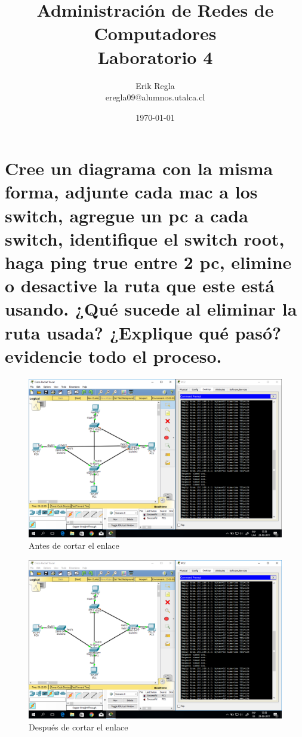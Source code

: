 \documentclass[11pt]{utalcaDoc}
\title{{\bf Administración de Redes de Computadores}\\ Laboratorio 4}
\author{Erik Regla\\ eregla09@alumnos.utalca.cl}
\date{\today}
\begin{document}
\maketitle

\section{Cree un diagrama con la misma forma, adjunte cada mac a los switch, agregue un pc a cada switch, identifique el switch root, haga ping true entre 2 pc, elimine o desactive la ruta que este est\'a usando. ¿Qu\'e sucede al eliminar la ruta usada? ¿Explique qu\'e pas\'o? evidencie todo el proceso.}


\begin{figure}[!ht]
  \centering
\includegraphics[scale=.3]{1} 
  \caption{Antes de cortar el enlace}
  \label{FIGURE:1}
\end{figure}

\begin{figure}[!ht]
  \centering
\includegraphics[scale=.3]{2} 
  \caption{Después de cortar el enlace}
  \label{FIGURE:2}
\end{figure}
\end{document}
